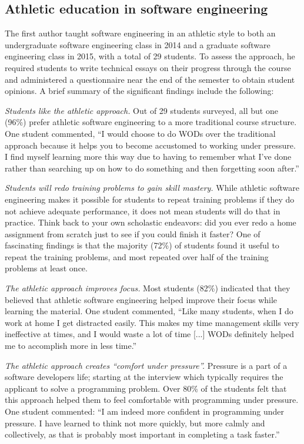 \subsection{Athletic education in software engineering}

The first author taught software engineering in an athletic style to both an undergraduate software engineering class in 2014 and a graduate software engineering class in 2015, with a total of 29 students. To assess the approach, he required students to write technical essays on their progress through the course and administered a questionnaire near the end of the semester to obtain student opinions. A brief summary of the significant findings include the following:

{\em Students like the athletic approach.} Out of 29 students surveyed, all but one (96\%) prefer athletic software engineering to a more traditional course structure.  One student commented, ``I would choose to do WODs over the traditional approach because it helps you to become accustomed to working under pressure. I find myself learning more this way due to having to remember what I’ve done rather than searching up on how to do something and then forgetting soon after.''

{\em Students will redo training problems to gain skill mastery.}  While athletic software engineering makes it possible for students to repeat training problems if they do not achieve adequate performance, it does not mean students will do that in practice. Think back to your own scholastic endeavors: did you ever redo a home assignment from scratch just to see if you could finish it faster? One of fascinating findings is that the majority (72\%) of students found it useful to repeat the training problems, and most repeated over half of the training problems at least once. 

{\em The athletic approach improves focus.}  Most students (82\%) indicated that they believed that athletic software engineering helped improve their focus while learning the material.  One student commented, ``Like many students, when I do work at home I get distracted easily. This makes my time management skills very ineffective at times, and I would waste a lot of time [...] WODs definitely helped me to accomplish more in less time.''

{\em The athletic approach creates ``comfort under pressure''.}  Pressure is a part of a software developers life; starting at the interview which typically requires the applicant to solve a programming problem.  Over 80\% of the students felt that this approach helped them to feel comfortable with programming under pressure.  One student commented: ``I am indeed more confident in programming under pressure. I have learned to think not more quickly, but more calmly and collectively, as that is probably most important in completing a task faster.''

